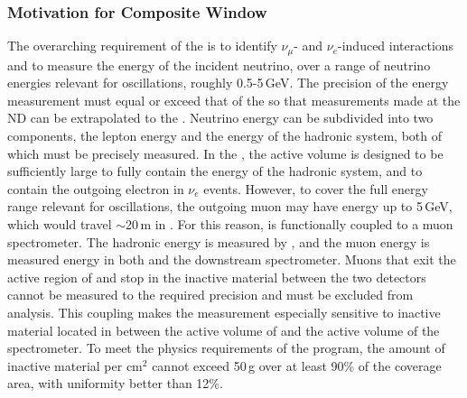 \subsubsection{Motivation for Composite Window}
The overarching requirement of the  is to identify $\nu_\mu$- and $\nu_e$-induced  interactions and to measure the energy of the incident neutrino, over a range of neutrino energies relevant for oscillations, roughly 0.5-5\,GeV. The precision of the energy measurement must equal or exceed that of the  so that measurements made at the ND can be extrapolated to the . Neutrino energy can be subdivided into two components, the lepton energy and the energy of the hadronic system, both of which must be precisely measured.  In the , the active  volume is designed to be sufficiently large to fully contain the energy of the hadronic system, and to contain the outgoing electron in $\nu_e$   events. However, to cover the full energy range relevant for oscillations, the outgoing muon may have energy up to 5\,GeV, which would travel $\sim$20\,m in . For this reason,  is functionally coupled to a muon spectrometer. The hadronic energy is measured by , and the muon energy is measured energy in both  and the downstream spectrometer. Muons that exit the active region of  and stop in the inactive material between the two detectors cannot be measured to the required precision and must be excluded from analysis. This coupling makes the measurement especially sensitive to inactive material located in between the active volume of  and the active volume of the spectrometer. To meet the physics requirements of the  program, %
the amount of inactive material per cm$^2$ cannot exceed 50\,g 
over at least 90\% of the coverage area, with uniformity better than 12\%.




